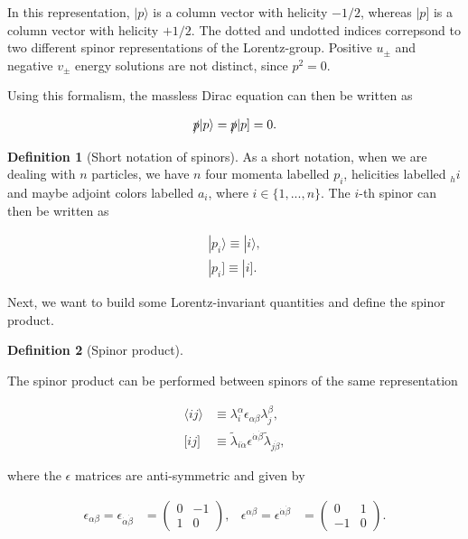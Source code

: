 \documentclass{article}
\theoremstyle{definition}
\newtheorem{definition}{Definition}[section]
\numberwithin{equation}{section}
\begin{document}
In this representation, $| p \rangle$ is a column vector with helicity $-1/2$, whereas $| p \rbrack$ is a column vector with helicity $+1/2$. The dotted and undotted indices correpsond to two different spinor representations of the Lorentz-group. Positive $u_{\pm}$ and negative $v_{\pm}$ energy solutions are not distinct, since $p^2 = 0$.

Using this formalism, the massless Dirac equation can then be written as

\begin{align*}
    \slashed{p} | p \rangle = \slashed{p} | p \rbrack = 0.
\end{align*}

\begin{definition}[Short notation of spinors]

As a short notation, when we are dealing with $n$ particles, we have $n$ four momenta labelled $p_i$, helicities labelled $_hi$ and maybe adjoint colors labelled $a_i$, where $i \in \{1, ..., n\}$. The $i$-th spinor can then be written as

\begin{align*}
    | p_i \rangle \equiv | i \rangle, \\
    | p_i \rbrack \equiv | i \rbrack.
\end{align*}

\end{definition}

Next, we want to build some Lorentz-invariant quantities and define the spinor product.

\begin{definition}[Spinor product]
\label{def:spinor_product}

The spinor product can be performed between spinors of the same representation

\begin{align*}
    \langle ij \rangle &\equiv \lambda^{\alpha}_i \epsilon_{\alpha \beta} \lambda^{\beta}_j, \\
    \lbrack ij \rbrack &\equiv \tilde{\lambda}_{i \dot{\alpha}} \epsilon^{\dot{\alpha} \dot{\beta}} \tilde{\lambda}_{j \dot{\beta}},
\end{align*}

where the $\epsilon$ matrices are anti-symmetric and given by

\begin{align*}
    \epsilon_{\alpha \beta} = \epsilon_{\dot{\alpha} \dot{\beta}} &= \begin{pmatrix}0 & -1 \\ 1 & 0\end{pmatrix}, & \epsilon^{\alpha \beta} = \epsilon^{\dot{\alpha} \dot{\beta}} &= \begin{pmatrix}0 & 1 \\ -1 & 0\end{pmatrix}.
\end{align*}

\end{definition}
\end{document}
